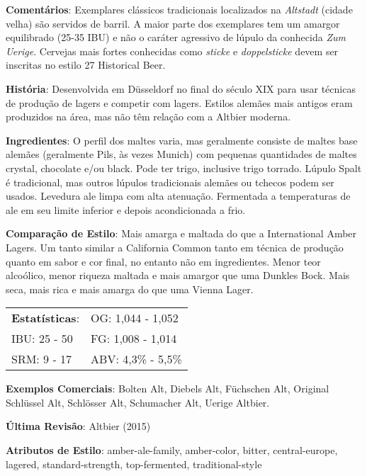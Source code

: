 \textbf{Comentários}: Exemplares clássicos tradicionais localizados na \textit{Altstadt} (cidade velha) são servidos de barril. A maior parte dos exemplares tem um amargor equilibrado (25-35 IBU) e não o caráter agressivo de lúpulo da conhecida \textit{Zum Uerige}. Cervejas mais fortes conhecidas como \textit{sticke} e \textit{doppelsticke} devem ser inscritas no estilo 27 Historical Beer.

\textbf{História}: Desenvolvida em Düsseldorf no final do século XIX para usar técnicas de produção de lagers e competir com lagers. Estilos alemães mais antigos eram produzidos na área, mas não têm relação com a Altbier moderna.

\textbf{Ingredientes}: O perfil dos maltes varia, mas geralmente consiste de maltes base alemães (geralmente Pils, às vezes Munich) com pequenas quantidades de maltes crystal, chocolate e/ou black. Pode ter trigo, inclusive trigo torrado. Lúpulo Spalt é tradicional, mas outros lúpulos tradicionais alemães ou tchecos podem ser usados. Levedura ale limpa com alta atenuação. Fermentada a temperaturas de ale em seu limite inferior e depois acondicionada a frio.

\textbf{Comparação de Estilo}: Mais amarga e maltada do que a International Amber Lagers. Um tanto similar a California Common tanto em técnica de produção quanto em sabor e cor final, no entanto não em ingredientes. Menor teor alcoólico, menor riqueza maltada e mais amargor que uma Dunkles Bock. Mais seca, mais rica e mais amarga do que uma Vienna Lager.

\begin{tabular}{@{}p{35mm}p{35mm}@{}}
  \textbf{Estatísticas}: & OG: 1,044 - 1,052 \\
  IBU: 25 - 50 & FG: 1,008 - 1,014 \\
  SRM: 9 - 17 & ABV: 4,3\% - 5,5\%
\end{tabular}

\textbf{Exemplos Comerciais}: Bolten Alt, Diebels Alt, Füchschen Alt, Original Schlüssel Alt, Schlösser Alt, Schumacher Alt, Uerige Altbier.

\textbf{Última Revisão}: Altbier (2015)

\textbf{Atributos de Estilo}: amber-ale-family, amber-color, bitter, central-europe, lagered, standard-strength, top-fermented, traditional-style
